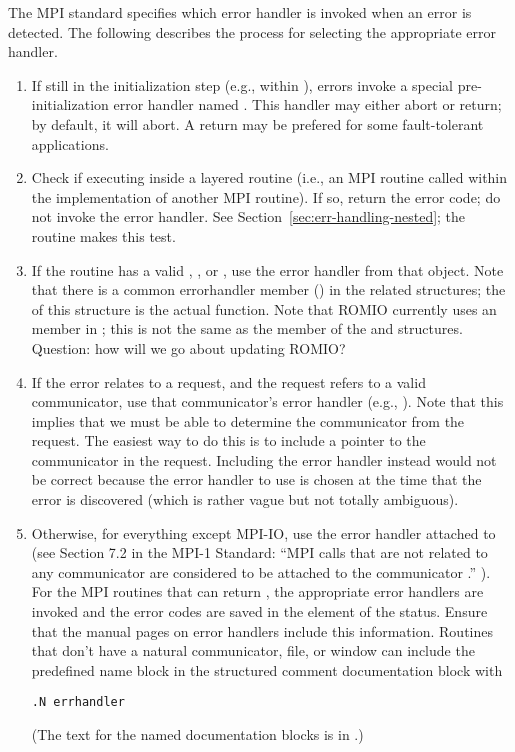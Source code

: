 \documentclass{article}
\begin{document}
The MPI standard specifies which error handler is invoked when an error is
detected.  The following describes the process for selecting the appropriate
error handler.

\begin{enumerate}
\item If still in the initialization step (e.g., within
), errors invoke a special pre-initialization error
handler named .  This handler may either abort or
return; by default, it will abort. 
A return may be prefered for some fault-tolerant applications.

\item Check if executing inside a layered routine (i.e., an MPI routine called
  within the implementation of another MPI routine).  If so, return
  the error
  code; do not invoke the error handler.  See
  Section~\ref{sec:err-handling-nested}; the  routine
  makes this test.

\item If the routine has a valid , , or
  , use the error handler from that object.  Note that there is
  a common errorhandler member () in the related structures;
  the  of this structure is the actual function.
  Note that ROMIO currently uses an  member
  in ; this is not the same as the  member
  of the  and  structures.
  Question: how will we go about updating ROMIO?

\item If the error relates to a request, and the request refers to a valid
  communicator, use that communicator's error handler (e.g., ).
  Note that this implies that we must be able to determine the communicator
  from the request.  The easiest way to do this is to include a
  pointer to the communicator in the request.  Including the error
  handler instead would not be correct because the error handler to
  use is chosen at the time that the error is discovered (which is
  rather vague but not totally ambiguous).


\item Otherwise, for everything except MPI-IO, use the error handler attached
  to   
  (see Section 7.2 in the MPI-1 Standard: ``MPI calls that are not related to
  any communicator are considered to be attached to the communicator
  .'' ).  
  For the MPI routines that can return , the
appropriate error handlers are invoked and the error codes are saved
in the  element of the status.
  Ensure that the manual pages on error handlers
  include this information.  Routines that don't have a natural
communicator, file, or window can include the predefined name block
 in the structured comment documentation block with
\begin{verbatim}
.N errhandler
\end{verbatim}
  (The text for the named documentation blocks is in .)


\end{enumerate}
\end{document}
